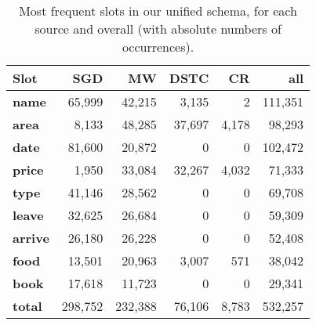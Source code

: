 \begin{table}[tp]
    \centering\footnotesize
    \begin{tabular}{l>{\hspace{-2mm}}rrrrr}
        \toprule
        \bf Slot &
        \textbf{SGD} & 
        \textbf{MW} &
        \textbf{DSTC} &
        \textbf{CR} &
         \textbf{all}\\ \midrule
        \textbf{name} & 65,999 & 42,215 & 3,135 & 2 & 111,351\\ 
        \textbf{area} & 8,133 & 48,285 & 37,697 & 4,178 & 98,293 \\ 
        \textbf{date} & 81,600 & 20,872 & 0 & 0 & 102,472\\
        \textbf{price} & 1,950 & 33,084 & 32,267 & 4,032 & 71,333\\
        \textbf{type}& 41,146 & 28,562 & 0 & 0 & 69,708\\
        \textbf{leave}& 32,625 & 26,684 & 0 & 0 & 59,309\\
        \textbf{arrive}& 26,180 & 26,228 & 0 & 0 & 52,408\\
        \textbf{food}& 13,501 & 20,963 & 3,007 & 571 & 38,042\\
        \textbf{book}& 17,618 & 11,723 & 0 & 0 & 29,341\\
        \midrule
        \textbf{total}& 298,752 & 232,388 & 76,106 & 8,783 & 532,257\\
        \bottomrule
    \end{tabular}
    \caption{Most frequent slots in our unified schema, for each source and overall (with absolute numbers of occurrences).}
    \label{tab:slots}
\end{table}

